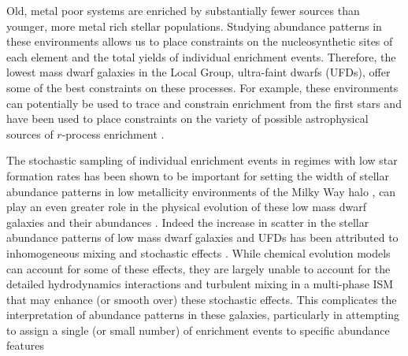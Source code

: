 \documentclass[twocolumn]{aastex62}
\begin{document}
Old, metal poor systems are enriched by substantially fewer sources than younger, more metal rich stellar populations. Studying abundance patterns in these environments allows us to place constraints on the nucleosynthetic sites of each element and the total yields of individual enrichment events. Therefore, the lowest mass dwarf galaxies in the Local Group, ultra-faint dwarfs (UFDs), offer some of the best constraints on these processes. For example, these environments can potentially be used to trace and constrain enrichment from the first stars \citep[e.g.][]{FrebelBromm2012,Ji2015,Ritter2015,Jeon2017,Hartwig2018} and have been used to place constraints on the variety of possible astrophysical sources of $r$-process enrichment \citep[e.g.][]{Ji2016a,Ji2016b,Ji2018a,Ji2019,Tsujimoto2017,Duggan2018,Nagasawa2018,Ojima2018,Skuladottir2019}.

The stochastic sampling of individual enrichment events in regimes with low star formation rates has been shown to be important for setting the width of stellar abundance patterns in low metallicity environments of the Milky Way halo \citep[e.g.][]{Cescutti2008,Cescutti2014}, can play an even greater role in the physical evolution of these low mass dwarf galaxies \citep{Applebaum2018,Su2018} and their abundances \citep[e.g.][]{RomanoStarkenburg2013,Romano2015,Ojima2018}. Indeed the increase in scatter in the stellar abundance patterns of low mass dwarf galaxies and UFDs has been attributed to inhomogeneous mixing and stochastic effects \citep[e.g.][]{Norris2010a,Lee2013,Simon2015,Mashonkina2017,Suda2017}. While chemical evolution models can account for some of these effects, they are largely unable to account for the detailed hydrodynamics interactions and turbulent mixing in a multi-phase ISM that may enhance (or smooth over) these stochastic effects. This complicates the interpretation of abundance patterns in these galaxies, particularly in attempting to assign a single (or small number) of enrichment events to specific abundance features \citep[e.g.][]{Ji2015,Fraser2017,Chen2017,Ishigaki2018,Welsh2019,Hartwig2019}
\end{document}
